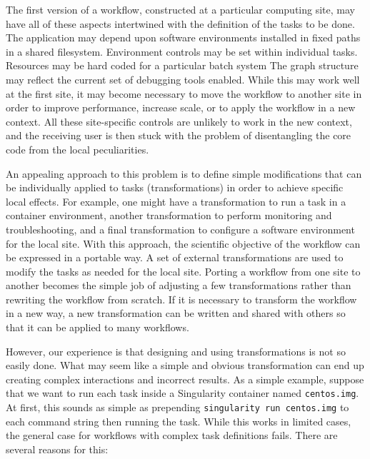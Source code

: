 \documentclass[conference]{IEEEtran}
\begin{document}
The first version of a workflow, constructed at a particular computing site,
may have all of these aspects intertwined with the definition of the
tasks to be done.  
The application may depend upon
software environments installed in fixed paths in a shared filesystem.
Environment controls may be set within individual tasks.
Resources may be
hard coded for a particular batch system
The graph structure may reflect
the current set of debugging tools enabled.  
While this may work well at the
first site, it may become necessary to move the workflow to another
site in order to improve performance, increase scale, or to apply the workflow in a new context.
All these site-specific controls are unlikely to work in the new context,
and the receiving user is then stuck with the problem of disentangling the
core code from the local peculiarities.

An appealing approach to this problem is to define 
simple modifications that can be individually applied to tasks
(transformations) in order
to achieve specific local effects.  For example, one might have a transformation
to run a task in a container environment, another transformation to perform monitoring
and troubleshooting, and a final transformation to configure a software environment
for the local site.  With this approach, the scientific objective of the workflow
can be expressed in a portable way. 
A set of external transformations are used to
modify the tasks as needed for the local site.  Porting a workflow from one site
to another becomes the simple job of adjusting a few transformations rather than
rewriting the workflow from scratch.  If it is necessary to transform
the workflow in a new way, a new transformation can be written and shared
with others so that it can be applied to many workflows.

However, our experience is that designing and using transformations
is not so easily done. What may seem like a simple and obvious
transformation can end up creating complex interactions and
incorrect results.  As a simple example, suppose that
we want to run each task inside a Singularity
container named {\tt centos.img}.
At first, this sounds
as simple as prepending {\tt singularity run centos.img} to each
command string then running the task.  While this 
works in limited cases, the general case for workflows
with complex task definitions fails.  There are several reasons for this:
\end{document}
